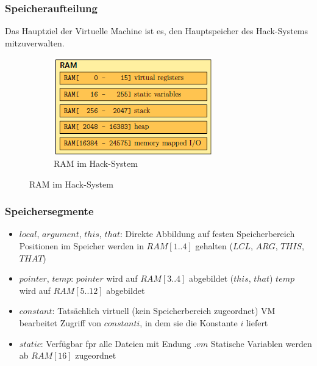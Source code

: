 \documentclass[12pt]{report}
\begin{document}
\subsubsection{Speicheraufteilung}
Das Hauptziel der Virtuelle Machine ist es, den Hauptspeicher des Hack-Systems mitzuverwalten.
\begin{figure}[H]
  \begin{minipage}[t]{0.45\textwidth}
    
  \end{minipage}
  \hfill
  \begin{minipage}[t]{0.45\textwidth}
    \begin{figure}[H]
      \caption{RAM im Hack-System}
      \label{fig:speicheraufteilung}
      \centering
      \includegraphics{speicheraufteilung}
    \end{figure}
  \end{minipage}
\end{figure}

\subsubsection{Speichersegmente}
\begin{itemize}
  \item $local$, $argument$, $this$, $that$:
        \subitem Direkte Abbildung auf festen Speicherbereich
        \subitem Positionen im Speicher werden in $RAM[1..4]$ gehalten ($LCL$, $ARG$, $THIS$, $THAT$)
        
  \item $pointer$, $temp$:
        \subitem $pointer$ wird auf $RAM[3..4]$ abgebildet ($this$, $that$)
        \subitem $temp$ wird auf  $RAM[5..12]$ abgebildet
        
  \item $constant$:
        \subitem Tatsächlich virtuell (kein Speicherbereich zugeordnet)
        \subitem VM bearbeitet Zugriff von $constant i$, in dem sie die Konstante $i$ liefert
        
  \item $static$:
        \subitem Verfügbar fpr alle Dateien mit Endung $.vm$
        \subitem Statische Variablen werden ab $RAM[16]$ zugeordnet
\end{itemize}
\end{document}
